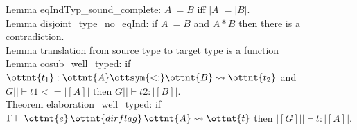 \documentclass{article}
\begin{document}
Lemma eqIndTyp\_sound\_complete: \quad $A ~= B$ iff $|A| = |B|$.\\

Lemma disjoint\_type\_no\_eqInd: \quad if $A ~= B$ and $A * B$ then
there is a contradiction.\\

Lemma translation from source type to target type is a function \\

Lemma cosub\_well\_typed: \quad if $\ottnt{t_{{\mathrm{1}}}}  :  \ottnt{A}  \ottsym{<:}  \ottnt{B}  \rightsquigarrow  \ottnt{t_{{\mathrm{2}}}}$ and $ G || \vdash t1 <= |[A]|$ then $ G || \vdash t2 : |[B]|$.\\

Theorem elaboration\_well\_typed: \quad if $\Gamma  \vdash  \ottnt{e} \, \ottnt{dirflag} \, \ottnt{A}  \rightsquigarrow  \ottnt{t}$ then
$|[ G ]|| \vdash t : |[A]|$.\\
\end{document}
